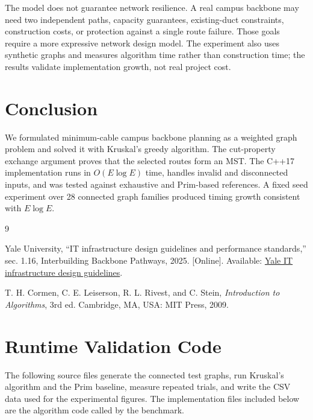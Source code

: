 \documentclass[conference]{IEEEtran}
\begin{document}
The model does not guarantee network resilience. A real campus backbone may
need two independent paths, capacity guarantees, existing-duct constraints,
construction costs, or protection against a single route failure. Those goals
require a more expressive network design model. The experiment also uses
synthetic graphs and measures algorithm time rather than construction time;
the results validate implementation growth, not real project cost.

\section{Conclusion}

We formulated minimum-cable campus backbone planning as a weighted graph
problem and solved it with Kruskal's greedy algorithm. The cut-property
exchange argument proves that the selected routes form an MST. The C++17
implementation runs in $O(E\log E)$ time, handles invalid and disconnected
inputs, and was tested against exhaustive and Prim-based references. A fixed
seed experiment over 28 connected graph families produced timing growth
consistent with $E\log E$.

\begin{thebibliography}{9}

Yale University, ``IT infrastructure design guidelines and performance
standards,'' sec. 1.16, Interbuilding Backbone Pathways, 2025. [Online].
Available: \href{https://facilities.yale.edu/sites/default/files/files/Design\%20Standards/IT\%20Infrastructure\%20Design\%20Guidelines\%20and\%20Performance\%20Standards_Rev1_5.pdf}{Yale IT infrastructure design guidelines}.

T. H. Cormen, C. E. Leiserson, R. L. Rivest, and C. Stein,
\emph{Introduction to Algorithms}, 3rd ed. Cambridge, MA, USA: MIT Press,
2009.

\end{thebibliography}

\appendices

\section{Runtime Validation Code}

The following source files generate the connected test graphs, run Kruskal's
algorithm and the Prim baseline, measure repeated trials, and write the CSV
data used for the experimental figures.  The implementation files included
below are the algorithm code called by the benchmark.
\end{document}
